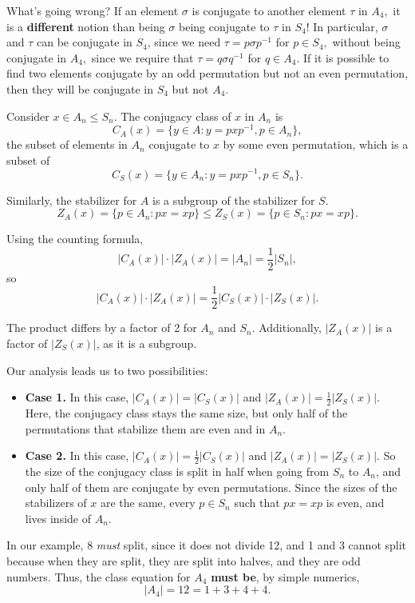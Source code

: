 What's going wrong? If an element $\sigma$ is conjugate to another element $\tau$ in $A_4,$ it is a \textbf{different} notion than being $\sigma$ being conjugate to $\tau$ in $S_4$! In particular, $\sigma$ and $\tau$ can be conjugate in $S_4$, since we need $\tau = p\sigma p^{-1}$ for $p \in S_4,$ without being conjugate in $A_4,$ since we require that $\tau = q\sigma q^{-1} $ for $q \in A_4.$ If it is possible to find two elements conjugate by an odd permutation but not an even permutation, then they will be conjugate in $S_4$ but not $A_4.$ 

Consider $x \in A_n \leq S_n.$ The conjugacy class of $x$ in $A_n$ is \[C_A(x) = \{y \in A: y = pxp^{-1}, p \in A_n\},\] the subset of elements in $A_n$ conjugate to $x$ by some even permutation, which is a subset of 
\[
C_S(x) = \{y \in A_n : y = pxp^{-1}, p \in S_n\}.
\]

Similarly, the stabilizer for $A$ is a subgroup of the stabilizer for $S.$ 
\[
Z_A(x) = \{p \in A_n: px = xp\} \leq Z_S(x) = \{p \in S_n: px = xp\}.
\]

Using the counting formula,
\[
|C_A(x)| \cdot |Z_A(x)| = |A_n| = \frac{1}{2}|S_n|,
\]
so  
\[
|C_A(x)| \cdot |Z_A(x)| = \frac{1}{2}|C_S(x)| \cdot |Z_S(x)|.
\]

The product differs by a factor of 2 for $A_n$ and $S_n$. Additionally, $|Z_A(x)|$ is a factor of $|Z_S(x)|$, as it is a subgroup.

Our analysis leads us to two possibilities: 
\begin{itemize}
    \item \textbf{Case 1.} In this case, $|C_A(x)| = |C_S(x)|$ and $|Z_A(x)| = \frac{1}{2}|Z_S(x)|.$ Here, the conjugacy class stays the same size, but only half of the permutations that stabilize them are even and in $A_n.$ 
    
    \item \textbf{Case 2.} In this case, $|C_A(x)| = \frac{1}{2}|C_S(x)|$ and $|Z_A(x)| = |Z_S(x)|.$ So the size of the conjugacy class is split in half when going from $S_n$ to $A_n$, and only half of them are conjugate by even permutations. Since the sizes of the stabilizers of $x$ are the same, every $p \in S_n$ such that $px = xp$ is even, and lives inside of $A_n.$
\end{itemize}

In our example, 8 \emph{must} split, since it does not divide 12, and 1 and 3 cannot split because when they are split, they are split into halves, and they are odd numbers. Thus, the class equation for $A_4$ \textbf{must be}, by simple numerics,
\[
|A_4| = 12 = 1 + 3 + 4 + 4.
\]

